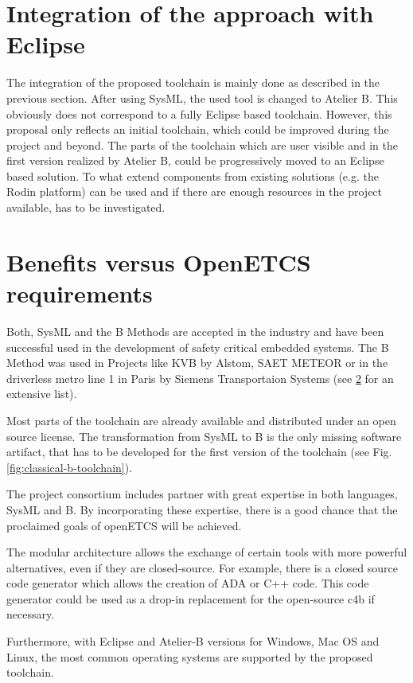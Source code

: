 \section{Integration of the approach with Eclipse}

The integration of the proposed toolchain is mainly done as described
in the previous section. After using SysML, the used tool is changed
to Atelier B. This obviously does not correspond to a fully Eclipse
based toolchain. However, this proposal only reflects an initial
toolchain, which could be improved during the project and beyond. The
parts of the toolchain which are user visible and in the first version
realized by Atelier B, could be progressively moved to an Eclipse
based solution. To what extend components from existing solutions
(e.g. the Rodin platform) can be used and if there are enough
resources in the project available, has to be investigated.

\section{Benefits versus OpenETCS requirements}

Both, SysML and the B Methods are accepted in the industry and have
been successful used in the development of safety critical embedded
systems. The B Method was used in Projects like KVB by Alstom, SAET
METEOR or in the driverless metro line 1 in Paris by Siemens
Transportaion Systems (see \ref{} for an extensive list).

Most parts of the toolchain are already available and distributed
under an open source license. The transformation from SysML to B is
the only missing software artifact, that has to be developed for the
first version of the toolchain (see
Fig. \ref{fig:classical-b-toolchain}).

The project consortium includes partner with great expertise in both
languages, SysML and B. By incorporating these expertise, there is a
good chance that the proclaimed goals of openETCS will be achieved.

The modular architecture allows the exchange of certain tools with
more powerful alternatives, even if they are closed-source. For
example, there is a closed source code generator which allows the
creation of ADA or C++ code. This code generator could be used as a
drop-in replacement for the open-source c4b if necessary.

Furthermore, with Eclipse and Atelier-B versions for Windows, Mac OS
and Linux, the most common operating systems are supported by the
proposed toolchain.

